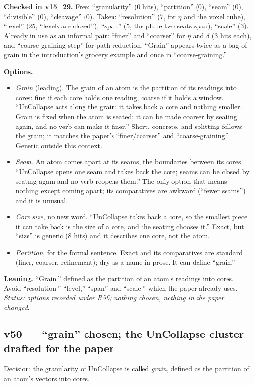 \documentclass[11pt]{article}
\begin{document}
\textbf{Checked in v15\_29.} Free: ``granularity'' ($0$ hits), ``partition'' ($0$), ``seam'' ($0$), ``divisible'' ($0$), ``cleavage'' ($0$). Taken: ``resolution'' ($7$, for $\eta$ and the voxel cube), ``level'' ($25$, ``levels are closed''), ``span'' ($5$, the plane two seats span), ``scale'' ($3$).
Already in use as an informal pair: ``finer'' and ``coarser'' for $\eta$ and $\delta$ ($3$ hits each), and ``coarse-graining step'' for path reduction. ``Grain'' appears twice as a bag of grain in the introduction's grocery example and once in ``coarse-graining.''

\textbf{Options.}
\begin{itemize}
\item \emph{Grain} (leading). The grain of an atom is the partition of its readings into cores: fine if each core holds one reading, coarse if it holds a window. ``UnCollapse acts along the grain: it takes back a core and nothing smaller. Grain is fixed when the atom is
seated; it can be made coarser by seating again, and no verb can make it finer.'' Short, concrete, and splitting follows the grain; it matches the paper's ``finer/coarser'' and ``coarse-graining.'' Generic outside this context.
\item \emph{Seam}. An atom comes apart at its seams, the boundaries between its cores. ``UnCollapse opens one seam and takes back the core; seams can be closed by seating again and no verb reopens them.'' The only option that means nothing except coming apart; its comparatives are awkward
(``fewer seams'') and it is unusual.
\item \emph{Core size}, no new word. ``UnCollapse takes back a core, so the smallest piece it can take back is the size of a core, and the seating chooses it.'' Exact, but ``size'' is generic ($8$ hits) and it describes one core, not the atom.
\item \emph{Partition}, for the formal sentence. Exact and its comparatives are standard (finer, coarser, refinement); dry as a name in prose. It can define ``grain.''
\end{itemize}
\textbf{Leaning.} ``Grain,'' defined as the partition of an atom's readings into cores. Avoid ``resolution,'' ``level,'' ``span'' and ``scale,'' which the paper already uses.
\emph{Status: options recorded under R56; nothing chosen, nothing in the paper changed.}


\subsection*{v50 --- ``grain'' chosen; the UnCollapse cluster drafted for the paper}
Decision: the granularity of UnCollapse is called \emph{grain}, defined as the partition of an atom's vectors into cores.
\end{document}
